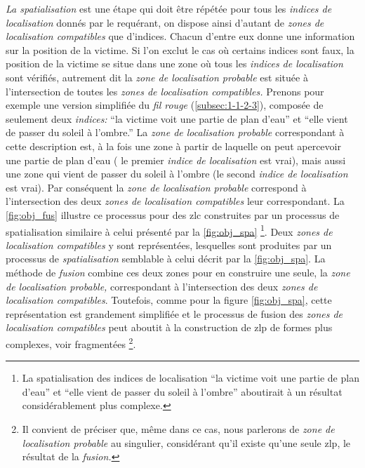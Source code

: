 \emph{La spatialisation} est une étape qui doit être répétée pour tous
les \emph{indices de localisation} donnés par le requérant, on dispose
ainsi d'autant de \emph{zones de localisation compatibles} que
d'indices. Chacun d'entre eux donne une information sur la position de
la victime. Si l'on exclut le cas où certains indices sont faux, la
position de la victime se situe dans une zone où tous les
\emph{indices de localisation} sont vérifiés, autrement dit la
\emph{zone de localisation probable} est située à l'intersection de
toutes les \emph{zones de localisation compatibles.}
%
Prenons pour exemple une version simplifiée du \emph{fil rouge}
(\ref{subsec:1-1-2-3}), composée de seulement deux \emph{indices:}
\enquote{la victime voit une partie de plan d'eau} et \enquote{elle
  vient de passer du soleil à l'ombre.}  La \emph{zone de localisation
  probable} correspondant à cette description est, à la fois une zone
à partir de laquelle on peut apercevoir une partie de plan d'eau (\ie
le premier \emph{indice de localisation} est vrai), mais aussi une
zone qui vient de passer du soleil à l'ombre (\ie le second
\emph{indice de localisation} est vrai). Par conséquent la \emph{zone
  de localisation probable} correspond à l'intersection des deux
\emph{zones de localisation compatibles} leur correspondant. La
\autoref{fig:obj_fus} illustre ce processus pour des \ac{zlc}
construites par un processus de spatialisation similaire à celui
présenté par la \autoref{fig:obj_spa} \footnote{La spatialisation des
  indices de localisation \enquote{la victime voit une partie de plan
    d'eau} et \enquote{elle vient de passer du soleil à l'ombre}
  aboutirait à un résultat considérablement plus complexe.}. Deux
\emph{zones de localisation compatibles} y sont représentées,
lesquelles sont produites par un processus de \emph{spatialisation}
semblable à celui décrit par la \autoref{fig:obj_spa}. La méthode de
\emph{fusion} combine ces deux zones pour en construire une seule, la
\emph{zone de localisation probable,} correspondant à l'intersection
des deux \emph{zones de localisation compatibles}. Toutefois, comme
pour la figure \ref{fig:obj_spa}, cette représentation est grandement
simplifiée et le processus de fusion des \emph{zones de localisation
  compatibles} peut aboutit à la construction de \ac{zlp} de formes
plus complexes, voir fragmentées \footnote{Il convient de préciser
  que, même dans ce cas, nous parlerons de \emph{zone de localisation
    probable} au singulier, considérant qu'il existe qu'une seule
  \ac{zlp}, le résultat de la \emph{fusion.}}.

